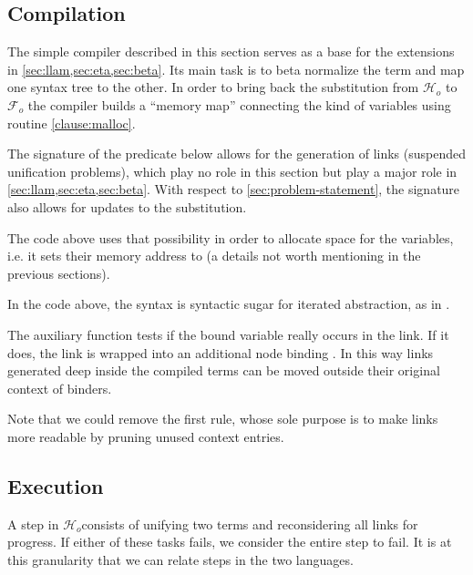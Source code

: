 \documentclass[sigconf,natbib=false,review]{acmart}
\newcommand{\Fo}{\texorpdfstring{\ensuremath{\mathcal{F}_{\!o}\xspace}}{Fo}} %
\newcommand{\Ho}{\texorpdfstring{\ensuremath{\mathcal{H}_o}\xspace}{Ho}}
\begin{document}
\subsection{Compilation}
\label{sec:compilation}

The simple compiler described in this section serves as a base for the
extensions in \cref{sec:llam,sec:eta,sec:beta}.
Its main task is to beta normalize the term and map one syntax tree to
the other.
In order to bring back the substitution from \Ho{} to \Fo{} the compiler
builds a ``memory map'' connecting the kind of variables using routine
\ref{clause:malloc}.

The signature of the  predicate below allows for the generation of
links (suspended unification problems), which play no role in this section
but play a major role in \cref{sec:llam,sec:eta,sec:beta}.
With respect to \cref{sec:problem-statement}, the signature also allows
for updates to the substitution.




\noindent
The code above uses that possibility
in order to allocate space for the variables, i.e. it sets their memory
address to  (a details not worth mentioning in the
previous sections).



\noindent
In the code above, the syntax  is syntactic sugar for
iterated  abstraction, as in .

The auxiliary function  tests if the bound variable
 really occurs in the link. If it does, the link is wrapped into
an additional  node binding . In this way links generated
deep inside the compiled terms can be moved outside their original context
of binders.



\noindent
Note that we could remove the first rule, whose sole purpose is to make
links more readable by pruning unused context entries.

\subsection{Execution}
\label{sec:execution}

A step in \Ho consists of unifying two terms and reconsidering all
links for progress. If either of these tasks fails, we consider the entire step to
fail. It is at this granularity that we can relate steps in the
two languages.
\end{document}
